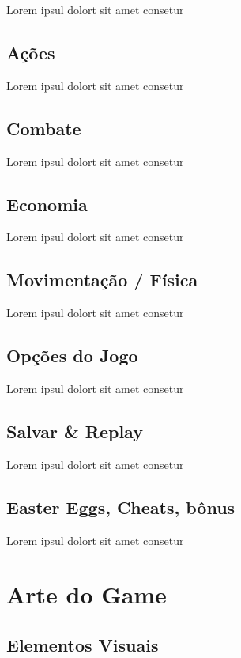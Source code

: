 Lorem ipsul dolort sit amet consetur

\section{Ações}

Lorem ipsul dolort sit amet consetur

\section{Combate}

Lorem ipsul dolort sit amet consetur

\section{Economia}

Lorem ipsul dolort sit amet consetur

\section{Movimentação / Física}

Lorem ipsul dolort sit amet consetur

\section{Opções do Jogo}

Lorem ipsul dolort sit amet consetur

\section{Salvar \& Replay}

Lorem ipsul dolort sit amet consetur

\section{Easter Eggs, Cheats, bônus}

Lorem ipsul dolort sit amet consetur


\chapter{Arte do Game}

\section{Elementos Visuais}

